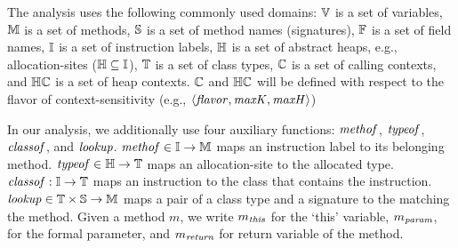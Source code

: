 The analysis uses the following commonly used domains:
$\mathbb{V}$ is a set of variables,
${\mathbb{M}}$ is a set of methods,
$\mathbb{S}$ is a set of method names (signatures),
$\mathbb{F}$ is a set of field names,
$\mathbb{I}$ is a set of instruction labels,
$\mathbb{H}$ is a set of abstract heaps, e.g.,
  allocation-sites ($\mathbb{H} \subseteq \mathbb{I}$),
$\mathbb{T}$ is a set of class types,
$\mathbb{C}$ is a set of calling contexts, and
$\mathbb{H}\mathbb{C}$ is a set of heap contexts.
$\mathbb{C}$ and $\mathbb{H}\mathbb{C}$ will be defined with  respect to 
the flavor of context-sensitivity (e.g., $\langle {\it flavor}, {\it maxK}, {\it maxH} \rangle$)


In our analysis, we additionally use four auxiliary functions: ${\it methof}$, ${\it typeof}$, ${\it classof}$, and ${\it lookup}$.
${\it methof}\in \mathbb{I} \to {\mathbb{M}}$ maps an instruction label to its belonging method.  ${\it typeof} \in \mathbb{H} \to \mathbb{T}$ maps an
allocation-site to the allocated type.
${\it classof} : \mathbb{I} \to \mathbb{T}$ maps an instruction to the class that contains the instruction.
${\it lookup} \in \mathbb{T} \times \mathbb{S} \to {\mathbb{M}}$ maps a pair of a class type
and a signature to the matching the method.
Given a method $m$, we write $m_{\it this}$ for the `this' variable, $m_{\it param}$, for the formal parameter, and 
$m_{\it return}$ for return variable of the method.

